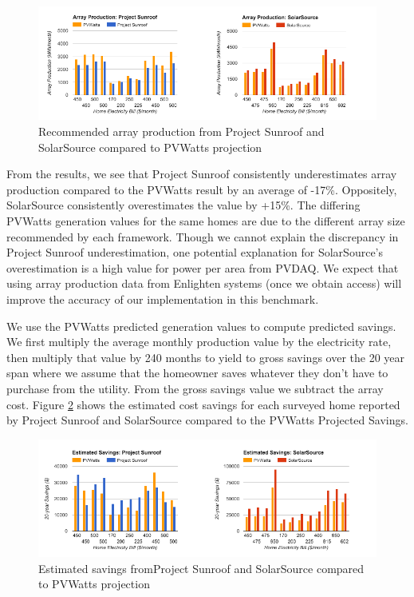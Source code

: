 \documentclass[pageno]{jpaper}
\begin{document}
\begin{figure}[h]
\begin{center}
\includegraphics[width = \textwidth] {wattsprod}
\caption{Recommended array production from Project Sunroof and SolarSource compared to PVWatts projection}
\label{fig:wattsprod}
\end{center}
\end{figure}

From the results, we see that Project Sunroof consistently underestimates array production compared to the PVWatts result by an average of -17\%. Oppositely, SolarSource consistently overestimates the value by +15\%. The differing PVWatts generation values for the same homes are due to the different array size recommended by each framework. Though we cannot explain the discrepancy in Project Sunroof underestimation, one potential explanation for SolarSource's overestimation is a high value for power per area from PVDAQ. We expect that using array production data from Enlighten systems (once we obtain access) will improve the accuracy of our implementation in this benchmark.

We use the PVWatts predicted generation values to compute predicted savings. We first multiply the average monthly production value by the electricity rate, then multiply that value by 240 months to yield to gross savings over the 20 year span where we assume that the homeowner saves whatever they don't have to purchase from the utility. From the gross savings value we subtract the array cost. Figure \ref{fig:wattscost} shows the estimated cost savings for each surveyed home reported by Project Sunroof and SolarSource compared to the PVWatts Projected Savings.

\begin{figure}[h]
\begin{center}
\includegraphics[width = \textwidth] {wattscost}
\caption{Estimated savings fromProject Sunroof and SolarSource compared to PVWatts projection}
\label{fig:wattscost}
\end{center}
\end{figure}
\end{document}
